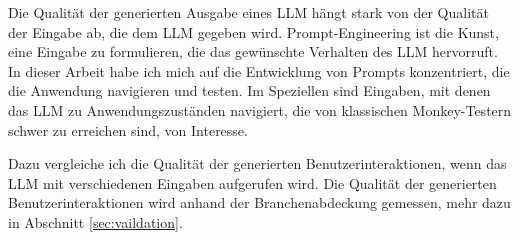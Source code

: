Die Qualität der generierten Ausgabe eines LLM hängt stark von der Qualität der Eingabe ab, die dem LLM gegeben wird. \cite{chain-of-thought}
Prompt-Engineering ist die Kunst, eine Eingabe zu formulieren, die das gewünschte Verhalten des LLM hervorruft.
In dieser Arbeit habe ich mich auf die Entwicklung von Prompts konzentriert, die die Anwendung navigieren und testen.
Im Speziellen sind Eingaben, mit denen das LLM zu Anwendungszuständen navigiert, die von klassischen Monkey-Testern schwer zu erreichen sind, von Interesse.

Dazu vergleiche ich die Qualität der generierten Benutzerinteraktionen, wenn das LLM mit verschiedenen Eingaben aufgerufen wird.
Die Qualität der generierten Benutzerinteraktionen wird anhand der Branchenabdeckung gemessen, mehr dazu in Abschnitt \ref{sec:vaildation}.

